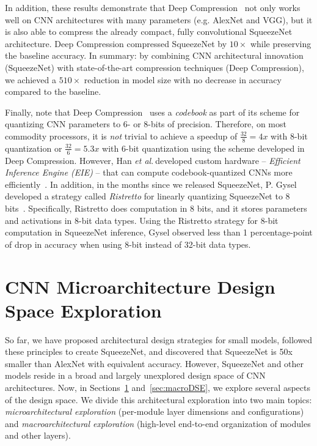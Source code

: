 \documentclass{article} \usepackage{iclr2017_conference,times}
\newcommand{\etal}{\textit{et al}.$~$}
\renewcommand{\cite}{\citep}
\def\vsp{\vspace{-0.15in}}
\begin{document}
In addition, these results demonstrate that Deep Compression~\cite{dally2015-2} not only works well on CNN architectures with many parameters (e.g. AlexNet and VGG), but it is also able to compress the already compact, fully convolutional SqueezeNet architecture. 
Deep Compression compressed SqueezeNet by $10\times$ while preserving the baseline accuracy.
In summary: by combining CNN architectural innovation (SqueezeNet) with state-of-the-art compression techniques (Deep Compression), we achieved a $510\times$ reduction in model size with no decrease in accuracy compared to the baseline.

Finally, note that Deep Compression~\cite{dally2015-1} uses a {\em codebook} as part of its scheme for quantizing CNN parameters to 6- or 8-bits of precision.
Therefore, on most commodity processors, it is {\em not} trivial to achieve a speedup of $\frac{32}{8}=4x$ with 8-bit quantization or $\frac{32}{6}=5.3x$ with 6-bit quantization using the scheme developed in Deep Compression.
However, Han \etal developed custom hardware -- {\em Efficient Inference Engine (EIE)} -- that can compute codebook-quantized CNNs more efficiently~\cite{EIE}.
In addition, in the months since we released SqueezeNet, P. Gysel developed a strategy called {\em Ristretto} for linearly quantizing SqueezeNet to 8 bits~\cite{Ristretto}.
Specifically, Ristretto does computation in 8 bits, and it stores parameters and activations in 8-bit data types.
Using the Ristretto strategy for 8-bit computation in SqueezeNet inference, Gysel observed less than 1 percentage-point of drop in accuracy when using 8-bit instead of 32-bit data types.


\section{CNN Microarchitecture Design Space Exploration}
\label{sec:microDSE}
\vsp

So far, we have proposed architectural design strategies for small models, followed these principles to create SqueezeNet, and discovered that SqueezeNet is 50x smaller than AlexNet with equivalent accuracy.
However, SqueezeNet and other models reside in a broad and largely unexplored design space of CNN architectures.
Now, in Sections~\ref{sec:microDSE} and~\ref{sec:macroDSE}, we explore several aspects of the design space. We divide this architectural exploration into two main topics: {\em microarchitectural exploration} (per-module layer dimensions and configurations) and {\em macroarchitectural exploration} (high-level end-to-end organization of modules and other layers). 
\end{document}
